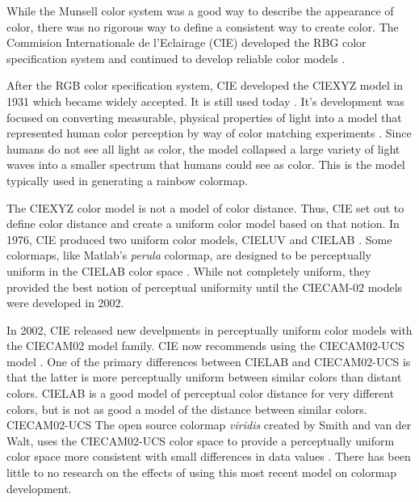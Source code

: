 \documentclass[journal,12pt]{IEEEtran}
\begin{document}
While the Munsell color system was a good way to describe the appearance of color,
there was no rigorous way to define a consistent way to create color. The Commision
Internationale de l'Eclairage (CIE) developed the RBG color specification system
and continued to develop reliable color models \cite{colorimetry}.


After the RGB color specification system, CIE developed the CIEXYZ model in 1931
which became widely accepted. It is still used today \cite{viridis}. It's development was 
focused on converting measurable, physical properties of light into a model
that represented human color perception by way of color matching experiments 
\cite{colorimetry}.
Since humans do not see all light 
as color, the model collapsed a large variety of light waves into a smaller 
spectrum that humans could see as color. This is the model typically used in 
generating a rainbow colormap.


The CIEXYZ color model is not a model of color distance. Thus, CIE set out to
define color distance and create a uniform color model based on that notion.
In 1976, CIE produced two uniform color models, CIELUV and CIELAB \cite{colorimetry}. Some colormaps,
like Matlab's \textit{perula} colormap, are designed to be perceptually
uniform in the CIELAB color space \cite{viridis}. While not 
completely uniform, they provided the best notion of perceptual uniformity until
the CIECAM-02 models were developed in 2002.


In 2002, CIE released new develpments in perceptually uniform color models with
the CIECAM02 model family. CIE now recommends using the CIECAM02-UCS model 
\cite{ciecam02}.
One of the primary differences between CIELAB and CIECAM02-UCS is that the latter
is more perceptually uniform between similar colors than distant colors. CIELAB
is a good model of perceptual color distance for very different colors, but 
is not as good a model of the distance between similar colors.
CIECAM02-UCS The open source colormap \textit{viridis} created by Smith and van der Walt, uses
the CIECAM02-UCS color space to provide a perceptually uniform color space more
consistent with small differences in data values \cite{viridis}. There has been
little to no research on the effects of using this most recent model on colormap
development.

\newpage




\end{document}
